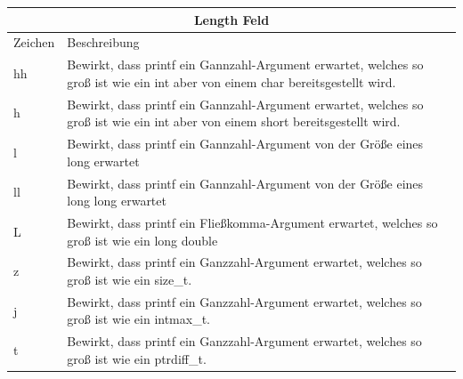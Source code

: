 \documentclass[a4paper,10pt]{article}
\begin{document}
\begin{center}
    \begin{tabularx}{\textwidth}{|l|X|}
        \hline
        \multicolumn{2}{|c|}{Length Feld} \\
        \hline
            Zeichen   & Beschreibung\\
        \hline
            hh             & Bewirkt, dass printf ein Gannzahl-Argument  erwartet,
                            welches so groß ist wie ein int aber von einem char bereitsgestellt wird.\\
            h              & Bewirkt, dass printf ein Gannzahl-Argument erwartet,
                            welches so groß ist wie ein int aber von einem short bereitsgestellt wird.\\
            l              & Bewirkt, dass printf ein Gannzahl-Argument von der Größe eines    
                            long erwartet\\
            ll             & Bewirkt, dass printf ein Gannzahl-Argument von der Größe eines    
                            long long erwartet\\
            L              & Bewirkt, dass printf ein Fließkomma-Argument erwartet,
                            welches so groß ist wie ein long double\\
            z              & Bewirkt, dass printf ein Ganzzahl-Argument erwartet,
                            welches so groß ist wie ein size\_t.\\
            j              & Bewirkt, dass printf ein Ganzzahl-Argument erwartet,
                            welches so groß ist wie ein intmax\_t.\\
            t              & Bewirkt, dass printf ein Ganzzahl-Argument erwartet,
                            welches so groß ist wie ein ptrdiff\_t.\\
        \hline
    \end{tabularx}
\end{center}
\end{document}
